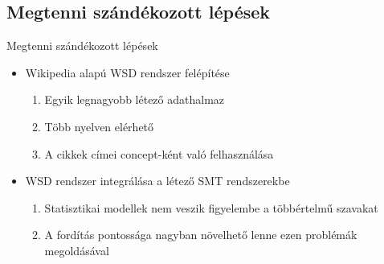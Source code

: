 \subsection{Megtenni szándékozott lépések}

\begin{frame}{Megtenni szándékozott lépések}
	
	\begin{itemize}
		
		\item Wikipedia alapú WSD rendszer felépítése
		\begin{enumerate}
			\item Egyik legnagyobb létező adathalmaz
			\item Több nyelven elérhető
			\item A cikkek címei concept-ként való felhasználása
		\end{enumerate}
		
		\item WSD rendszer integrálása a létező SMT rendszerekbe
		\begin{enumerate}
			\item Statisztikai modellek nem veszik figyelembe a  többértelmű szavakat
			\item A fordítás pontossága nagyban növelhető lenne ezen problémák megoldásával
		\end{enumerate}
		
	\end{itemize}

\end{frame}

\newcommand{\savecounter}{\setcounter{enumcounter}{\theenumi}}
\newcommand{\restorecounter}{\setcounter{enumi}{\theenumcounter}}


